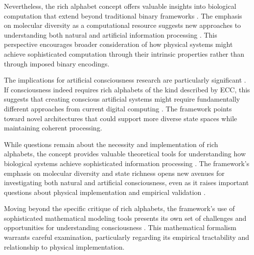 Nevertheless, the rich alphabet concept offers valuable insights into biological computation that extend beyond traditional binary frameworks \cite{noe2009out}. The emphasis on molecular diversity as a computational resource suggests new approaches to understanding both natural and artificial information processing \cite{koch2019feeling}. This perspective encourages broader consideration of how physical systems might achieve sophisticated computation through their intrinsic properties rather than through imposed binary encodings.

The implications for artificial consciousness research are particularly significant \cite{chalmers2010character}. If consciousness indeed requires rich alphabets of the kind described by ECC, this suggests that creating conscious artificial systems might require fundamentally different approaches from current digital computing \cite{seth2021being}. The framework points toward novel architectures that could support more diverse state spaces while maintaining coherent processing.

While questions remain about the necessity and implementation of rich alphabets, the concept provides valuable theoretical tools for understanding how biological systems achieve sophisticated information processing \cite{goff2019galileo}. The framework's emphasis on molecular diversity and state richness opens new avenues for investigating both natural and artificial consciousness, even as it raises important questions about physical implementation and empirical validation \cite{thompson2014waking}.

Moving beyond the specific critique of rich alphabets, the framework's use of sophisticated mathematical modeling tools presents its own set of challenges and opportunities for understanding consciousness \cite{dennett2017bacteria}. This mathematical formalism warrants careful examination, particularly regarding its empirical tractability and relationship to physical implementation.